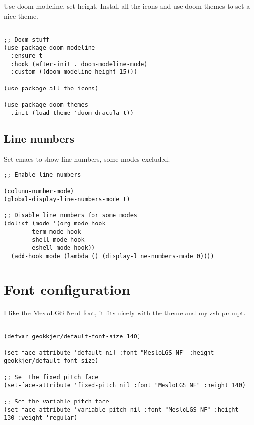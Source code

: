 \documentclass[11pt]{article}
\begin{document}
Use doom-modeline, set height. Install all-the-icons and use doom-themes to set a nice theme.

\begin{verbatim}

;; Doom stuff
(use-package doom-modeline
  :ensure t
  :hook (after-init . doom-modeline-mode)
  :custom ((doom-modeline-height 15)))

(use-package all-the-icons)

(use-package doom-themes
  :init (load-theme 'doom-dracula t))

\end{verbatim}

\subsection{Line numbers}
\label{sec:orgb0ac333}
Set emacs to show line-numbers, some modes excluded.

\begin{verbatim}
;; Enable line numbers

(column-number-mode)
(global-display-line-numbers-mode t)

;; Disable line numbers for some modes
(dolist (mode '(org-mode-hook
		term-mode-hook
		shell-mode-hook
		eshell-mode-hook))
  (add-hook mode (lambda () (display-line-numbers-mode 0))))

\end{verbatim}

\section{Font configuration}
\label{sec:org1ed9e28}

I like the MesloLGS Nerd font, it fits nicely with the theme and my zsh prompt.

\begin{verbatim}

(defvar geokkjer/default-font-size 140)

(set-face-attribute 'default nil :font "MesloLGS NF" :height geokkjer/default-font-size)

;; Set the fixed pitch face
(set-face-attribute 'fixed-pitch nil :font "MesloLGS NF" :height 140)

;; Set the variable pitch face
(set-face-attribute 'variable-pitch nil :font "MesloLGS NF" :height 130 :weight 'regular)

\end{verbatim}
\end{document}
